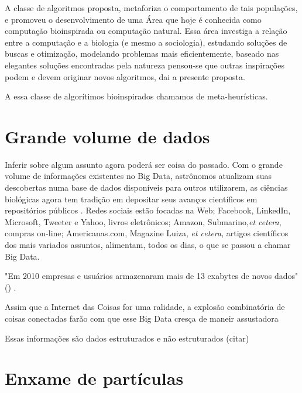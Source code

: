 \documentclass[conference,compsoc]{IEEEtran}
\begin{document}
A classe de algoritmos proposta, metaforiza o comportamento de tais populações, e promoveu o desenvolvimento de uma Área que hoje é conhecida como computação bioinspirada 
ou computação natural. Essa área investiga a relação entre a computação e a biologia (e mesmo a sociologia), estudando soluções de buscas e otimização, modelando problemas 
mais eficientemente, baseado nas elegantes soluções encontradas pela natureza pensou-se que outras inspirações podem e devem originar novos algoritmos, dai a presente 
proposta.

A essa classe de algorítimos bioinspirados chamamos de meta-heurísticas.

\section{Grande volume de dados}\label{arte:bigdata}

Inferir sobre algum assunto agora poderá ser coisa do passado. Com o grande volume de informações existentes no Big Data, astrônomos atualizam suas descobertas numa base 
de dados disponíveis para outros utilizarem, as ciências biológicas agora tem tradição em depositar seus avanços científicos em repositórios públicos \cite{bigdataQualquerUm}.
Redes sociais estão focadas na Web; Facebook, LinkedIn, Microsoft, Tweeter e Yahoo, livros eletrônicos; Amazon, Submarino,\textit{et cetera}, compras on-line; Americanas.com, Magazine Luiza,
\textit{et cetera}, artigos científicos dos mais variados assuntos, alimentam, todos os dias, o que se passou a chamar Big Data.

"Em 2010 empresas e usuários armazenaram mais de 13 exabytes de novos dados" (\cite{bigdataQualquerUm}) \cite{bigdataQualquerUm}.

Assim que a Internet das Coisas for uma ralidade, a explosão combinatória de coisas conectadas farão com que esse Big Data cresça de maneir assustadora


Essas informações são dados estruturados e não estruturados (citar)



\section{Enxame de partículas}\label{arte:enxames}
\end{document}
